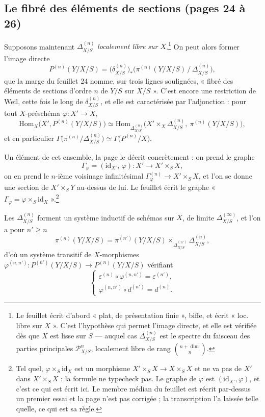 \documentclass[11pt,a4paper]{article}
\begin{document}
\subsection*{Le fibré des éléments de sections (pages 24 à 26)}

Supposons maintenant $\Delta^{(n)}_{X/S}$ \emph{localement libre sur
$X$}.\footnote{Le feuillet écrit d'abord « plat, de présentation finie », biffe,
et écrit « loc. libre sur $X$ ». C'est l'hypothèse qui permet l'image directe,
et elle est vérifiée dès que $X$ est lisse sur $S$ — auquel cas
$\Delta^{(n)}_{X/S}$ est le spectre du faisceau des parties principales
$\mathcal{P}^{n}_{X/S}$, localement libre de rang $\binom{n+\dim}{n}$.} On peut
alors former l'image directe
\[
  P^{(n)}(Y/X/S) = \bigl(\delta^{(n)}_{X/S}\bigr)_{*}
  \bigl(\pi^{(n)}(Y/X/S) \,/\, \Delta^{(n)}_{X/S}\bigr) ,
\]
que la marge du feuillet 24 nomme, sur trois lignes soulignées, « fibré des
éléments de sections d'ordre $n$ de $Y/S$ sur $X/S$ ». C'est encore une
restriction de Weil, cette fois le long de $\delta^{(n)}_{X/S}$, et elle est
caractérisée par l'adjonction : pour tout $X$-préschéma $\varphi : X' \to X$,
\[
  \mathrm{Hom}_{X}\bigl(X', P^{(n)}(Y/X/S)\bigr) \simeq
  \mathrm{Hom}_{\Delta^{(n)}_{X/S}}\bigl(X' \times_{X}
  \Delta^{(n)}_{X/S},\ \pi^{(n)}(Y/X/S)\bigr) ,
\]
et en particulier $\Gamma\bigl(\pi^{(n)}/\Delta^{(n)}_{X/S}\bigr) \simeq
\Gamma\bigl(P^{(n)}/X\bigr)$.

Un élément de cet ensemble, la page le décrit concrètement : on prend le graphe
\[
  \Gamma_{\varphi} = (\mathrm{id}_{X'},\, \varphi) :
  X' \longrightarrow X' \times_{S} X ,
\]
on en prend le $n$-ième voisinage infinitésimal $\Gamma_{\varphi}^{(n)} \to X'
\times_{S} X$, et l'on se donne une section de $X' \times_{S} Y$ au-dessus de
lui. Le feuillet écrit le graphe « $\Gamma_{\varphi} = \varphi \times_{S}
\mathrm{id}_{X}$ ».\footnote{Tel quel, $\varphi \times_S \mathrm{id}_X$ est un
morphisme $X' \times_S X \to X \times_S X$ et ne va pas de $X'$ dans $X'
\times_S X$ : la formule ne typecheck pas. Le graphe de $\varphi$ est
$(\mathrm{id}_{X'}, \varphi)$, et c'est ce qui est écrit ici. Le membre médian
du feuillet est récrit par-dessus un premier essai et la page n'est pas
corrigée ; la transcription l'a laissée telle quelle, ce qui est sa règle.}

Les $\Delta^{(n)}_{X/S}$ forment un système inductif de schémas sur $X$, de
limite $\Delta^{(\infty)}_{X/S}$, et l'on a pour $n' \geqslant n$
\[
  \pi^{(n)}(Y/X/S) = \pi^{(n')}(Y/X/S) \times_{\Delta^{(n')}_{X/S}}
  \Delta^{(n)}_{X/S} ,
\]
d'où un système transitif de $X$-morphismes
$\varphi^{(n,n')} : P^{(n')}(Y/X/S) \to P^{(n)}(Y/X/S)$ vérifiant
\[
  \begin{cases}
    \varepsilon^{(n)} \circ \varphi^{(n,n')} = \varepsilon^{(n')} , \\[3pt]
    \varphi^{(n,n')} \circ d^{(n')} = d^{(n)} .
  \end{cases}
\]
\end{document}
